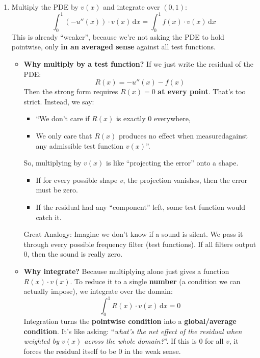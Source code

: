\begin{enumerate}
    \item {} Multiply the PDE by $v(x)$ and integrate over $(0,1)$:
    \begin{equation}
        \displaystyle\int_0^1 \left(-u''(x)\right) \cdot v(x)\, \mathrm{d}x = \displaystyle\int_0^1 f(x) \cdot v(x)\, \mathrm{d}x
    \end{equation}
    This is already ``weaker'', because we're not asking the PDE to hold pointwise, only \textbf{in an averaged sense} against all test functions.
    \begin{itemize}
        \item[\textcolor{Green3}{\faIcon{question-circle}}] \textcolor{Green3}{\textbf{Why multiply by a test function?}} If we just write the residual of the PDE:
        \begin{equation}
            R(x) = -u''(x) - f(x)
        \end{equation}
        Then the strong form requires $R(x) = 0$ \textbf{at every point}. That's too strict. Instead, we say:
        \begin{itemize}
            \item ``We don't care if $R(x)$ is exactly 0 everywhere,
            \item We only care that $R(x)$ produces no effect when measured\break against any admissible test function $v(x)$''.
        \end{itemize}
        So, multiplying by $v(x)$ is like ``projecting the error'' onto a shape.
        \begin{itemize}
            \item If for every possible shape $v$, the projection vanishes, then the error must be zero.
            \item If the residual had any ``component'' left, some test function would catch it.
        \end{itemize}
        Great Analogy: Imagine we don't know if a sound is silent. We pass it through every possible frequency filter (test functions). If all filters output 0, then the sound is really zero.

        \item[\textcolor{Green3}{\faIcon{question-circle}}] \textcolor{Green3}{\textbf{Why integrate?}} Because multiplying alone just gives a function $R(x) \cdot v(x)$. To reduce it to a single \textbf{number} (a condition we can actually impose), we integrate over the domain:
        \begin{equation*}
            \displaystyle\int_0^1 R(x) \cdot v(x)\, \mathrm{d}x = 0
        \end{equation*}
        Integration turns the \textbf{pointwise condition} into a \textbf{global/average condition}. It's like asking: ``\emph{what's the net effect of the residual when weighted by $v(x)$ across the whole domain?}''. If this is 0 for all $v$, it forces the residual itself to be 0 in the weak sense.


\end{itemize}
\end{enumerate}
